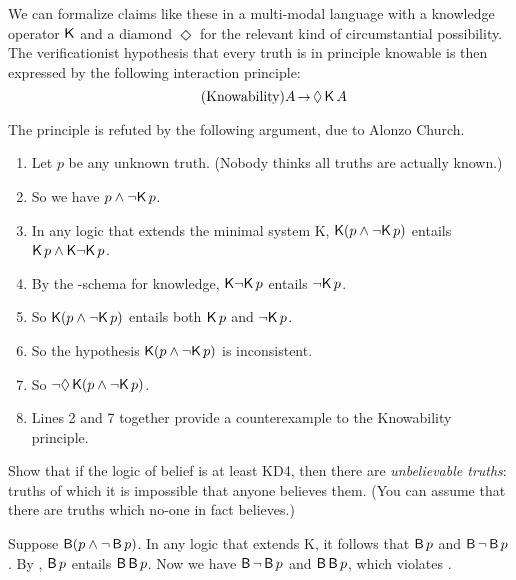 We can formalize claims like these in a multi-modal language with a knowledge
operator $\operatorname{\mathsf{K}{}}$ and a diamond $\Diamond$ for the relevant kind of circumstantial
possibility. The verificationist hypothesis that every truth is in principle
knowable is then expressed by the following interaction principle:
%
\begin{equation}\tag{Knowability}
  A \to \Diamond \Kn A
\end{equation}

The principle is refuted by the following argument, due to Alonzo Church.

\begin{enumerate}[leftmargin=10mm]
  \itemsep-1mm
  \item Let $p$ be any unknown truth. (Nobody thinks all truths are actually
        known.)
  \item So we have $p \land \neg\! \operatorname{\mathsf{K}{}} p$.
  \item In any logic that extends the minimal system K,
        $\operatorname{\mathsf{K}{}}(p \land \neg\! \operatorname{\mathsf{K}{}} p)$ entails $\operatorname{\mathsf{K}{}} p \land \operatorname{\mathsf{K}{}}\! \neg \!\operatorname{\mathsf{K}{}} p$.
  \item By the -schema for knowledge, $\operatorname{\mathsf{K}{}}\! \neg \!\operatorname{\mathsf{K}{}} p$ entails
        $\neg\! \operatorname{\mathsf{K}{}} p$.
  \item So $\operatorname{\mathsf{K}{}}(p \land \neg\! \operatorname{\mathsf{K}{}} p)$ entails both $\operatorname{\mathsf{K}{}} p$ and $\neg\! \operatorname{\mathsf{K}{}} p$.
  \item So the hypothesis $\operatorname{\mathsf{K}{}}(p \land \neg\! \operatorname{\mathsf{K}{}} p)$ is inconsistent.
  \item So $\neg \Diamond \operatorname{\mathsf{K}{}}(p \land \neg\! \operatorname{\mathsf{K}{}} p)$.
  \item Lines 2 and 7 together provide a counterexample to the Knowability
        principle.
\end{enumerate}

\begin{exercise}
  Show that if the logic of belief is at least KD4, then there are
  \emph{unbelievable truths}: truths of which it is impossible that anyone
  believes them. (You can assume that there are truths which no-one in fact
  believes.)
\end{exercise}
\begin{solution}
  Suppose $\operatorname{\mathsf{B}}(p \land \neg \operatorname{\mathsf{B}} p)$. In any logic that extends K, it follows
  that $\operatorname{\mathsf{B}} p$ and $\operatorname{\mathsf{B}} \neg \operatorname{\mathsf{B}} p$. By , $\operatorname{\mathsf{B}} p$ entails
  $\operatorname{\mathsf{B}}\operatorname{\mathsf{B}} p$. Now we have $\operatorname{\mathsf{B}} \neg \operatorname{\mathsf{B}} p$ and $\operatorname{\mathsf{B}}\operatorname{\mathsf{B}} p$, which violates .
\end{solution}








